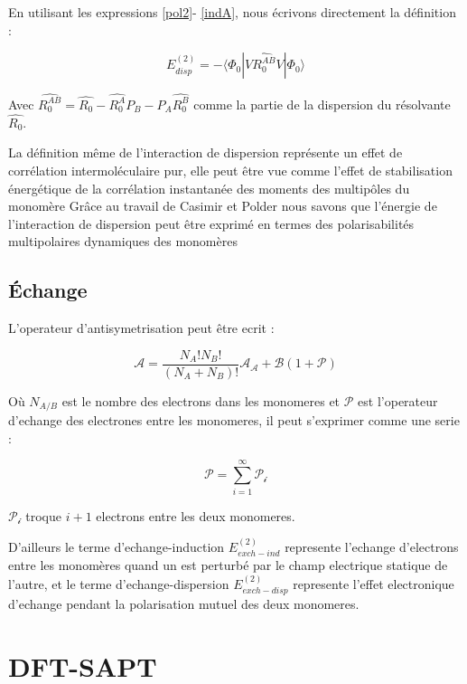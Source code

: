 En utilisant les expressions \ref{pol2}- \ref{indA}, nous écrivons directement la définition : 

\begin{equation}
E_{disp}^{(2)} = -\langle \Phi_{0}|V\hat{R_{0}^{AB}}V|\Phi_{0}\rangle
\end{equation}
 
 Avec $\hat{R_{0}^{AB}} = \hat{R_{0}}- \hat{R_{0}^{A}}P_{B} - P_{A}\hat{R_{0}^{B}}$ comme la partie de la dispersion du résolvante $\hat{R_{0}}$. 
 
 La définition même de l'interaction de dispersion représente un effet de corrélation intermoléculaire pur, elle peut être vue comme l'effet de stabilisation énergétique de la corrélation instantanée des moments des multipôles du monomère Grâce au travail de Casimir et Polder \cite{casimir1948influence} nous savons que l'énergie de l'interaction de dispersion peut être exprimé en termes des polarisabilités multipolaires dynamiques des monomères 


\subsection{Échange}

L'operateur d'antisymetrisation peut être ecrit : 

\begin{equation}
\mathscr{A} = \frac{N_{A}! N_{B}!}{(N_{A}+ N_{B})!} \mathscr{A_{A}} + \mathscr{B} (1+\mathscr{P})
\end{equation}

Où $N_{A/B}$ est le nombre des electrons dans les monomeres et $\mathscr{P}$ est l'operateur d'echange des electrones entre les monomeres, il peut s'exprimer comme une serie :

\begin{equation}
\mathscr{P} = \sum_{i=1}^{\infty} \mathscr{P_{i}}
\end{equation}

$\mathscr{P_{i}}$ troque $i+1$ electrons entre les deux monomeres. 

D'ailleurs le terme d'echange-induction $E_{exch-ind}^{(2)}$ represente l'echange d'electrons entre les monomères quand un est perturbé par le champ electrique statique de l'autre, et le terme d'echange-dispersion $E_{exch-disp}^{(2)}$ represente l'effet electronique d'echange pendant la polarisation mutuel des deux monomeres.   


\section{DFT-SAPT}

